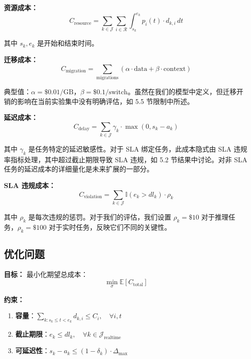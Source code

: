 \documentclass[10pt,a4paper]{article}
\begin{document}
\textbf{资源成本：}
\begin{equation}
C_{\text{resource}} = \sum_{k \in \mathcal{J}} \sum_{i \in \mathcal{R}} \int_{s_k}^{e_k} p_i(t) \cdot d_{k,i} \, dt
\end{equation}

其中 $s_k, e_k$ 是开始和结束时间。

\textbf{迁移成本：}
\begin{equation}
C_{\text{migration}} = \sum_{\text{migrations}} (\alpha \cdot \text{data} + \beta \cdot \text{context})
\end{equation}

典型值：$\alpha = \$0.01/\text{GB}$，$\beta = \$0.1/\text{switch}$。虽然在我们的模型中定义，但迁移开销的影响在当前实验集中没有明确评估，如 5.5 节限制中所述。

\textbf{延迟成本：}
\begin{equation}
C_{\text{delay}} = \sum_{k \in \mathcal{J}} \gamma_k \cdot \max(0, s_k - a_k)
\end{equation}

其中 $\gamma_k$ 是任务特定的延迟敏感性。对于 SLA 绑定任务，此成本隐式由 SLA 违规率指标处理，其中超过截止期限导致 SLA 违规，如 5.2 节结果中讨论。对非 SLA 任务的延迟成本的详细量化是未来扩展的一部分。

\textbf{SLA 违规成本：}
\begin{equation}
C_{\text{violation}} = \sum_{k \in \mathcal{J}} \mathbb{I}(e_k > dl_k) \cdot \rho_k
\end{equation}

其中 $\rho_k$ 是每次违规的惩罚。对于我们的评估，我们设置 $\rho_k = \$10$ 对于推理任务，$\rho_k = \$100$ 对于实时任务，反映它们不同的关键性。

\subsection{优化问题}

\textbf{目标：} 最小化期望总成本：
\begin{equation}
\min_{\sigma} \mathbb{E}[C_{\text{total}}]
\end{equation}

\textbf{约束：}
\begin{enumerate}
    \item \textbf{容量}：$\sum_{k: s_k \leq t < e_k} d_{k,i} \leq C_i, \quad \forall i, t$
    \item \textbf{截止期限}：$e_k \leq dl_k, \quad \forall k \in \mathcal{J}_{\text{realtime}}$
    \item \textbf{可延迟性}：$s_k - a_k \leq (1 - \delta_k) \cdot \Delta_{\max}$
\end{enumerate}
\end{document}
